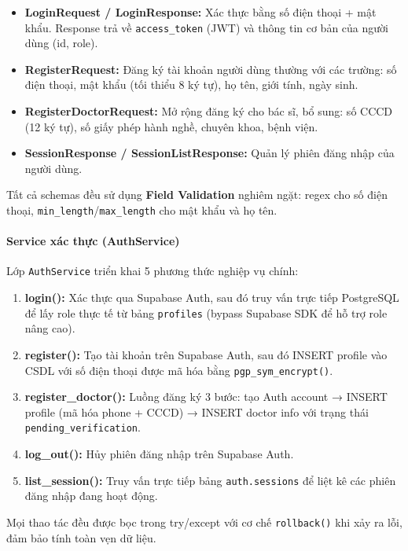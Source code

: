 \documentclass[a4paper,12pt]{article}
\begin{document}
\begin{itemize}
    \item \textbf{LoginRequest / LoginResponse:} Xác thực bằng số điện thoại + mật khẩu. Response trả về \texttt{access\_token} (JWT) và thông tin cơ bản của người dùng (id, role).
    \item \textbf{RegisterRequest:} Đăng ký tài khoản người dùng thường với các trường: số điện thoại, mật khẩu (tối thiểu 8 ký tự), họ tên, giới tính, ngày sinh.
    \item \textbf{RegisterDoctorRequest:} Mở rộng đăng ký cho bác sĩ, bổ sung: số CCCD (12 ký tự), số giấy phép hành nghề, chuyên khoa, bệnh viện.
    \item \textbf{SessionResponse / SessionListResponse:} Quản lý phiên đăng nhập của người dùng.
\end{itemize}

Tất cả schemas đều sử dụng \textbf{Field Validation} nghiêm ngặt: regex cho số điện thoại, \texttt{min\_length}/\texttt{max\_length} cho mật khẩu và họ tên.

\paragraph{Service xác thực (AuthService)}

Lớp \texttt{AuthService} triển khai 5 phương thức nghiệp vụ chính:

\begin{enumerate}
    \item \textbf{login():} Xác thực qua Supabase Auth, sau đó truy vấn trực tiếp PostgreSQL để lấy role thực tế từ bảng \texttt{profiles} (bypass Supabase SDK để hỗ trợ role nâng cao).
    \item \textbf{register():} Tạo tài khoản trên Supabase Auth, sau đó INSERT profile vào CSDL với số điện thoại được mã hóa bằng \texttt{pgp\_sym\_encrypt()}.
    \item \textbf{register\_doctor():} Luồng đăng ký 3 bước: tạo Auth account → INSERT profile (mã hóa phone + CCCD) → INSERT doctor info với trạng thái \texttt{pending\_verification}.
    \item \textbf{log\_out():} Hủy phiên đăng nhập trên Supabase Auth.
    \item \textbf{list\_session():} Truy vấn trực tiếp bảng \texttt{auth.sessions} để liệt kê các phiên đăng nhập đang hoạt động.
\end{enumerate}

Mọi thao tác đều được bọc trong try/except với cơ chế \texttt{rollback()} khi xảy ra lỗi, đảm bảo tính toàn vẹn dữ liệu.
\end{document}
